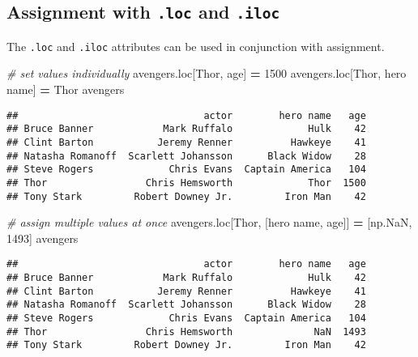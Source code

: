 \documentclass[
]{book}
\newenvironment{Shaded}{\begin{snugshade}}{\end{snugshade}}
\newcommand{\CommentTok}[1]{\textcolor[rgb]{0.56,0.35,0.01}{\textit{#1}}}
\newcommand{\DecValTok}[1]{\textcolor[rgb]{0.00,0.00,0.81}{#1}}
\newcommand{\NormalTok}[1]{#1}
\newcommand{\OperatorTok}[1]{\textcolor[rgb]{0.81,0.36,0.00}{\textbf{#1}}}
\newcommand{\StringTok}[1]{\textcolor[rgb]{0.31,0.60,0.02}{#1}}
\begin{document}
\hypertarget{assignment-with-.loc-and-.iloc}{%
\subsection{\texorpdfstring{Assignment with \texttt{.loc} and \texttt{.iloc}}{Assignment with .loc and .iloc}}\label{assignment-with-.loc-and-.iloc}}

The \texttt{.loc} and \texttt{.iloc} attributes can be used in conjunction with assignment.

\begin{Shaded}
\begin{Highlighting}[]
\CommentTok{\# set values individually}
\NormalTok{avengers.loc[}\StringTok{\textquotesingle{}Thor\textquotesingle{}}\NormalTok{, }\StringTok{\textquotesingle{}age\textquotesingle{}}\NormalTok{] }\OperatorTok{=} \DecValTok{1500}
\NormalTok{avengers.loc[}\StringTok{\textquotesingle{}Thor\textquotesingle{}}\NormalTok{, }\StringTok{\textquotesingle{}hero name\textquotesingle{}}\NormalTok{] }\OperatorTok{=} \StringTok{\textquotesingle{}Thor\textquotesingle{}}
\NormalTok{avengers}
\end{Highlighting}
\end{Shaded}

\begin{verbatim}
##                                actor        hero name   age
## Bruce Banner            Mark Ruffalo             Hulk    42
## Clint Barton           Jeremy Renner          Hawkeye    41
## Natasha Romanoff  Scarlett Johansson      Black Widow    28
## Steve Rogers             Chris Evans  Captain America   104
## Thor                 Chris Hemsworth             Thor  1500
## Tony Stark         Robert Downey Jr.         Iron Man    42
\end{verbatim}

\begin{Shaded}
\begin{Highlighting}[]
\CommentTok{\# assign multiple values at once}
\NormalTok{avengers.loc[}\StringTok{\textquotesingle{}Thor\textquotesingle{}}\NormalTok{, [}\StringTok{\textquotesingle{}hero name\textquotesingle{}}\NormalTok{, }\StringTok{\textquotesingle{}age\textquotesingle{}}\NormalTok{]] }\OperatorTok{=}\NormalTok{ [np.NaN, }\DecValTok{1493}\NormalTok{]}
\NormalTok{avengers}
\end{Highlighting}
\end{Shaded}

\begin{verbatim}
##                                actor        hero name   age
## Bruce Banner            Mark Ruffalo             Hulk    42
## Clint Barton           Jeremy Renner          Hawkeye    41
## Natasha Romanoff  Scarlett Johansson      Black Widow    28
## Steve Rogers             Chris Evans  Captain America   104
## Thor                 Chris Hemsworth              NaN  1493
## Tony Stark         Robert Downey Jr.         Iron Man    42
\end{verbatim}
\end{document}
